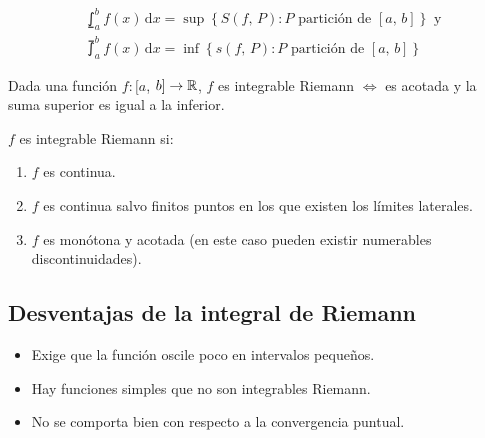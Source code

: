 \begin{align*}
     & \lowint_a^b f(x) \, \mathrm{d}x = \sup \left\{ S(f\text{, } P) : P \text{ partición de } [a\text{, } b] \right\} \text{ y } \\
     & \upint_a^b f(x) \, \mathrm{d}x = \inf \left\{ s(f\text{, } P) : P \text{ partición de } [a\text{, } b] \right\}
\end{align*}


\begin{prop}
    Dada una función \(f: [a\), \(b] \to \mathbb{R}\), \(f\) es integrable Riemann \(\iff\) es acotada y la suma superior es igual a la inferior.
\end{prop}

\begin{note}
    \(f\) es integrable Riemann si: \begin{enumerate}
        \item \(f\) es continua.
        \item \(f\) es continua salvo finitos puntos en los que existen los límites laterales.
        \item \(f\) es monótona y acotada (en este caso pueden existir numerables discontinuidades).
    \end{enumerate}
\end{note}

\subsection{Desventajas de la integral de Riemann}
\begin{itemize}
    \item Exige que la función oscile poco en intervalos pequeños.
    \item Hay funciones simples que no son integrables Riemann.
    \item No se comporta bien con respecto a la convergencia puntual.
\end{itemize}

